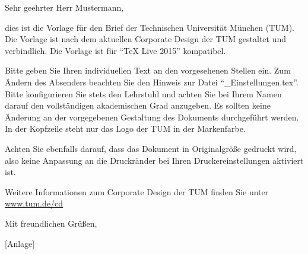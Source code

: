 \documentclass{tumletter} %
\begin{document}
\raggedright
\begin{letter}

\opening{Sehr geehrter Herr Mustermann,}

dies ist die Vorlage für den Brief der Technischen Universität München (TUM).
Die Vorlage ist nach dem aktuellen Corporate Design der TUM gestaltet und
verbindlich. Die Vorlage ist für "`TeX Live 2015"' kompatibel.

Bitte geben Sie Ihren individuellen Text an den vorgesehenen Stellen ein. Zum
Ändern des Absenders beachten Sie den Hinweis zur Datei
"`\_Einstellungen.tex"'. Bitte konfigurieren Sie stets den Lehrstuhl und
achten Sie bei Ihrem Namen darauf den vollständigen akademischen Grad
anzugeben. Es sollten keine Änderung an der vorgegebenen Gestaltung des
Dokuments durchgeführt werden. In der Kopfzeile steht nur das Logo der TUM in
der Markenfarbe.

Achten Sie ebenfalls darauf, dass das Dokument in Originalgröße gedruckt wird,
also keine Anpassung an die Druckränder bei Ihren Druckereinstellungen
aktiviert ist.

Weitere Informationen zum Corporate Design der TUM finden Sie unter
\href{http://www.tum.de/cd}{www.tum.de/cd}


Mit freundlichen Grüßen,
\vspace*{3\baselineskip} \newline %
 \newline %

[Anlage]{~}
\encl{}

\end{letter}
\end{document}

